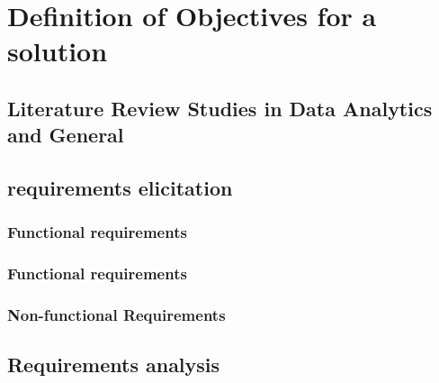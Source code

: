 \newpage\section{Definition of Objectives for a solution}

\subsection{Literature Review Studies in Data Analytics and General}

\subsection{requirements elicitation}

\subsubsection{Functional requirements}

\subsubsection{Functional requirements}

\subsubsection{Non-functional Requirements}

\subsection{Requirements analysis}